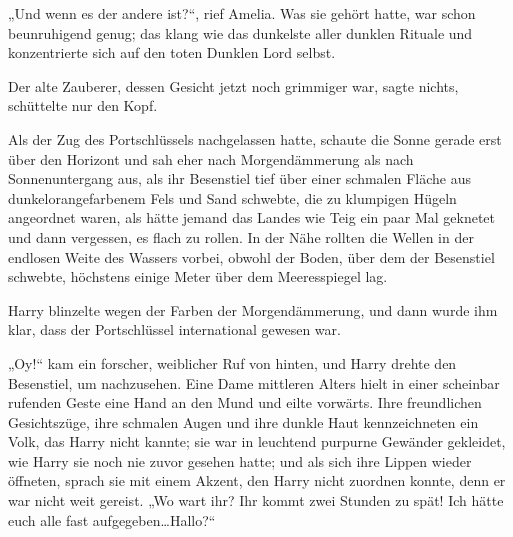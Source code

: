 „Und wenn es der andere ist?“, rief Amelia. Was sie gehört hatte, war schon beunruhigend genug; das klang wie das dunkelste aller dunklen Rituale und konzentrierte sich auf den toten Dunklen Lord selbst.

Der alte Zauberer, dessen Gesicht jetzt noch grimmiger war, sagte nichts, schüttelte nur den Kopf.

\later

Als der Zug des Portschlüssels nachgelassen hatte, schaute die Sonne gerade erst über den Horizont und sah eher nach Morgendämmerung als nach Sonnenuntergang aus, als ihr Besenstiel tief über einer schmalen Fläche aus dunkelorangefarbenem Fels und Sand schwebte, die zu klumpigen Hügeln angeordnet waren, als hätte jemand das Landes wie Teig ein paar Mal geknetet und dann vergessen, es flach zu rollen. In der Nähe rollten die Wellen in der endlosen Weite des Wassers vorbei, obwohl der Boden, über dem der Besenstiel schwebte, höchstens einige Meter über dem Meeresspiegel lag.

Harry blinzelte wegen der Farben der Morgendämmerung, und dann wurde ihm klar, dass der Portschlüssel international gewesen war.

„Oy!“ kam ein forscher, weiblicher Ruf von hinten, und Harry drehte den Besenstiel, um nachzusehen. Eine Dame mittleren Alters hielt in einer scheinbar rufenden Geste eine Hand an den Mund und eilte vorwärts. Ihre freundlichen Gesichtszüge, ihre schmalen Augen und ihre dunkle Haut kennzeichneten ein Volk, das Harry nicht kannte; sie war in leuchtend purpurne Gewänder gekleidet, wie Harry sie noch nie zuvor gesehen hatte; und als sich ihre Lippen wieder öffneten, sprach sie mit einem Akzent, den Harry nicht zuordnen konnte, denn er war nicht weit gereist.
„Wo wart ihr? Ihr kommt zwei Stunden zu spät! Ich hätte euch alle fast aufgegeben…Hallo?“


